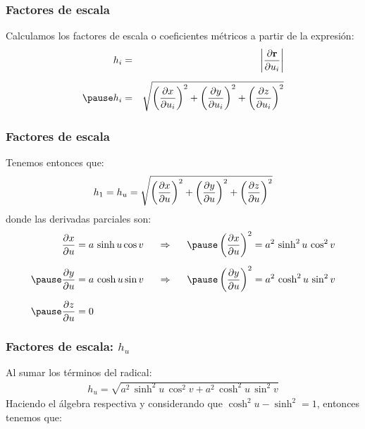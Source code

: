 \documentclass[12pt]{beamer}
\begin{document}
\begin{frame}
\frametitle{Factores de escala}
Calculamos los factores de escala o coeficientes métricos a partir de la expresión:
\pause
\begin{eqnarray*}
h_{i} &=& \abs{\pdv{\vb{r}}{u_{i}}} \\[0.5em]
\pause
h_{i} &=& \sqrt{ \left( \pdv{x}{u_{i}} \right)^{2} + \left( \pdv{y}{u_{i}} \right)^{2} + \left( \pdv{z}{u_{i}} \right)^{2}}
\end{eqnarray*}
\end{frame}
\begin{frame}
\frametitle{Factores de escala}
Tenemos entonces que:
\pause
\begin{align*}
h_{1} = h_{u} = \sqrt{ \left( \pdv{x}{u} \right)^{2} + \left( \pdv{y}{u} \right)^{2} + \left( \pdv{z}{u} \right)^{2}}
\end{align*}
\pause
donde las derivadas parciales son:
\pause
\fontsize{12}{12}\selectfont
\begin{eqnarray*}
\begin{aligned}
\pdv{x}{u} &= a \, \sinh u \cos v \hspace{0.5cm} \Rightarrow \hspace{0.5cm} \pause \left( \pdv{x}{u} \right)^{2} = a^{2} \, \sinh^{2} u \, \cos^{2} v \\[0.5em] \pause 
\pdv{y}{u} &= a \, \cosh u \sin v \hspace{0.5cm} \Rightarrow \hspace{0.5cm} \pause \left( \pdv{y}{u} \right)^{2} = a^{2} \, \cosh^{2} u \, \sin^{2} v \\[0.5em] \pause 
\pdv{z}{u} &= 0
\end{aligned}
\end{eqnarray*}
\end{frame}
\begin{frame}
\frametitle{Factores de escala: $h_{u}$}
Al sumar los términos del radical:
\pause
\begin{align*}
h_{u} = \sqrt{a^{2} \, \sinh^{2} u \, \cos^{2} v + a^{2} \, \cosh^{2} u \, \sin^{2} v}
\end{align*}
Haciendo el álgebra respectiva y considerando que $\cosh^{2} u - \sinh^{2} = 1$, entonces tenemos que:
\end{frame}
\end{document}
